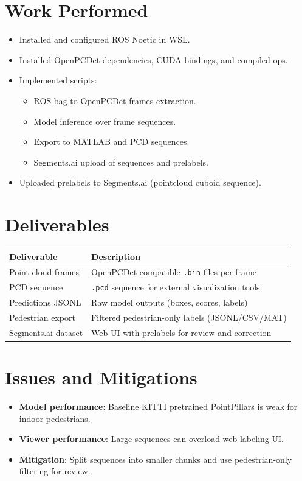 \documentclass[11pt,a4paper]{report}
\begin{document}
\chapter{Work Performed}
\begin{itemize}[leftmargin=2em]
    \item Installed and configured ROS Noetic in WSL.
    \item Installed OpenPCDet dependencies, CUDA bindings, and compiled ops.
    \item Implemented scripts:
    \begin{itemize}[leftmargin=2em]
        \item ROS bag to OpenPCDet frames extraction.
        \item Model inference over frame sequences.
        \item Export to MATLAB and PCD sequences.
        \item Segments.ai upload of sequences and prelabels.
    \end{itemize}
    \item Uploaded prelabels to Segments.ai (pointcloud cuboid sequence).
\end{itemize}

\chapter{Deliverables}
\begin{longtable}{p{} p{}}
\textbf{Deliverable} & \textbf{Description} \\
\hline
Point cloud frames & OpenPCDet-compatible \texttt{.bin} files per frame \\
PCD sequence & \texttt{.pcd} sequence for external visualization tools \\
Predictions JSONL & Raw model outputs (boxes, scores, labels) \\
Pedestrian export & Filtered pedestrian-only labels (JSONL/CSV/MAT) \\
Segments.ai dataset & Web UI with prelabels for review and correction \\
\end{longtable}

\chapter{Issues and Mitigations}
\begin{itemize}[leftmargin=2em]
    \item \textbf{Model performance}: Baseline KITTI pretrained PointPillars is weak for indoor pedestrians.
    \item \textbf{Viewer performance}: Large sequences can overload web labeling UI.
    \item \textbf{Mitigation}: Split sequences into smaller chunks and use pedestrian-only filtering for review.
\end{itemize}
\end{document}
